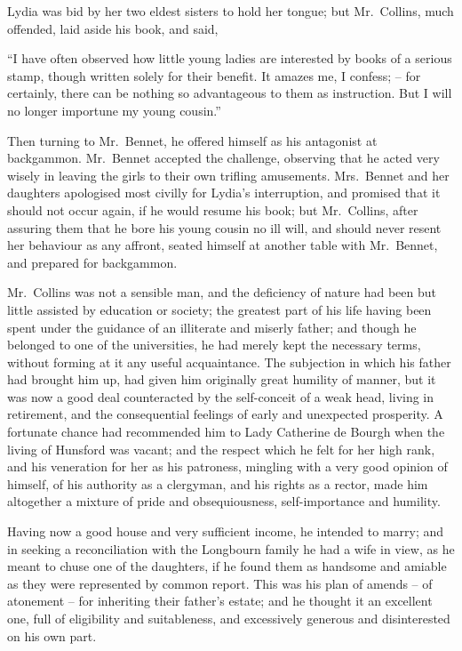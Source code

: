 Lydia was bid by her two eldest sisters to hold her
tongue; but Mr.\ Collins, much offended, laid aside his
book, and said,

“I have often observed how little young ladies are
interested by books of a serious stamp, though written
solely for their benefit. It amazes me, I confess; -- for
certainly, there can be nothing so advantageous to them
as instruction. But I will no longer importune my young
cousin.”

Then turning to Mr.\ Bennet, he offered himself as his
antagonist at backgammon. Mr.\ Bennet accepted the
challenge, observing that he acted very wisely in leaving
the girls to their own trifling amusements. Mrs.\ Bennet
and her daughters apologised most civilly for Lydia’s
interruption, and promised that it should not occur again,
if he would resume his book; but Mr.\ Collins, after
assuring them that he bore his young cousin no ill will,
and should never resent her behaviour as any affront,
seated himself at another table with Mr.\ Bennet, and
prepared for backgammon.


Mr.\ Collins was not a sensible man, and the deficiency
of nature had been but little assisted by education or
society; the greatest part of his life having been spent
under the guidance of an illiterate and miserly father;
and though he belonged to one of the universities, he had
merely kept the necessary terms, without forming at it
any useful acquaintance. The subjection in which his
father had brought him up, had given him originally great
humility of manner, but it was now a good deal counteracted
by the self-conceit of a weak head, living in retirement,
and the consequential feelings of early and unexpected
prosperity. A fortunate chance had recommended
him to Lady Catherine de Bourgh when the living of
Hunsford was vacant; and the respect which he felt for
her high rank, and his veneration for her as his patroness,
mingling with a very good opinion of himself, of his
authority as a clergyman, and his rights as a rector, made
him altogether a mixture of pride and obsequiousness,
self-importance and humility.

Having now a good house and very sufficient income,
he intended to marry; and in seeking a reconciliation
with the Longbourn family he had a wife in view, as he
meant to chuse one of the daughters, if he found them
as handsome and amiable as they were represented by
common report. This was his plan of amends -- of atonement -- for
inheriting their father’s estate; and he thought
it an excellent one, full of eligibility and suitableness,
and excessively generous and disinterested on his own
part.


